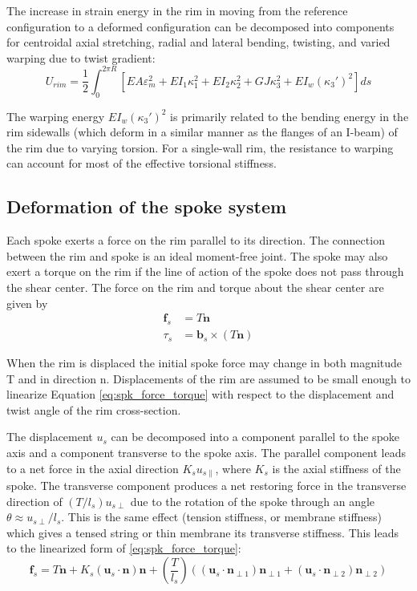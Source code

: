 \documentclass[../thesis.tex]{subfiles}
\newcommand{\n}{\mathbf{n}}
\newcommand{\npo}{\mathbf{n}_{\perp 1}}
\newcommand{\npt}{\mathbf{n}_{\perp 2}}
\newcommand{\bs}{\mathbf{b}_s}
\begin{document}
The increase in strain energy in the rim in moving from the reference configuration to a deformed configuration can be decomposed into components for centroidal axial stretching, radial and lateral bending, twisting, and varied warping due to twist gradient:
\begin{equation}
\label{eq:U_rim}
U_{rim} = \frac{1}{2} \int_0^{2\pi R}[EA\varepsilon_m^2 + EI_1\kappa_1^2+EI_2\kappa_2^2 + GJ\kappa_3^2 + EI_w(\kappa_3')^2]ds
\end{equation}

The warping energy $EI_w(\kappa_3')^2$ is primarily related to the bending energy in the rim sidewalls (which deform in a similar manner as the flanges of an I-beam) of the rim due to varying torsion. For a single-wall rim, the resistance to warping can account for most of the effective torsional stiffness.

\subsection{Deformation of the spoke system}

Each spoke exerts a force on the rim parallel to its direction. The connection between the rim and spoke is an ideal moment-free joint. The spoke may also exert a torque on the rim if the line of action of the spoke does not pass through the shear center. The force on the rim and torque about the shear center are given by
\begin{subequations}
\label{eq:spk_force_torque}
\begin{align}
\mathbf{f}_s &= T\mathbf{n}\\
\tau_s &= \bs \times ( T\mathbf{n} )
\end{align}
\end{subequations}

When the rim is displaced the initial spoke force may change in both magnitude T and in direction n. Displacements of the rim are assumed to be small enough to linearize Equation \eqref{eq:spk_force_torque} with respect to the displacement and twist angle of the rim cross-section.

The displacement $u_s$ can be decomposed into a component parallel to the spoke axis and a component transverse to the spoke axis. The parallel component leads to a net force in the axial direction $K_s u_{s\parallel}$, where $K_s$ is the axial stiffness of the spoke. The transverse component produces a net restoring force in the transverse direction of $(T/l_s) u_{s\perp}$ due to the rotation of the spoke through an angle $\theta \approx u_{s\perp}/l_s$. This is the same effect (tension stiffness, or membrane stiffness) which gives a tensed string or thin membrane its transverse stiffness. This leads to the linearized form of \eqref{eq:spk_force_torque}:
\begin{equation}
\label{eq:fs_us}
\mathbf{f}_s = T\n +
    K_s (\mathbf{u}_s \cdot \n)\n +
    \left(\frac{T}{l_s}\right) \left((\mathbf{u}_s \cdot \npo ) \npo +
                                     (\mathbf{u}_s \cdot \npt ) \npt \right)
\end{equation}
\end{document}
